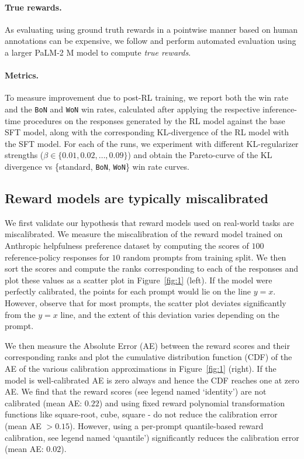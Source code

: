 \documentclass{article}
\newcommand{\theertha}[1]{{\color{red}{theertha: #1}}}
\newcommand{\theertha}[1]{}
\newcommand{\bofn}{\texttt{BoN}\xspace}
\newcommand{\wofn}{\texttt{WoN}\xspace}
\begin{document}
\vspace{-.05in}
\paragraph{True rewards.} As evaluating using ground truth rewards in a pointwise manner based on human annotations can be expensive, we follow \cite{eisenstein2023helping, mudgal2023controlled} and perform automated evaluation using a larger PaLM-2 M model to compute \textit{true rewards}.

\vspace{-.05in}
\paragraph{Metrics.}
To measure improvement due to post-RL training, we report both the win rate and the \bofn and \wofn win rates, calculated after applying the respective inference-time procedures on the responses generated by the RL model against the base SFT model, along with the corresponding KL-divergence of the RL model with the SFT model. For each of the runs, we experiment with different KL-regularizer strengths ($\beta \in \{0.01, 0.02, \ldots , 0.09\}$) and obtain the Pareto-curve of the KL divergence vs \{standard, \bofn, \wofn\} win rate curves. 

%
\subsection{Reward models are typically miscalibrated}
We first validate our hypothesis that reward models used on real-world tasks are miscalibrated. We measure the miscalibration of the reward model trained on Anthropic helpfulness preference dataset by computing the scores of $100$ reference-policy responses for $10$ random prompts from training split. \theertha{ananth: for next iteration, regenerate figure 2 on test split.} We then sort the scores and compute the ranks corresponding to each of the responses and plot these values as a scatter plot in Figure~\ref{fig:1} (left). If the model were perfectly calibrated, the points for each prompt would lie on the line $y=x$. However, observe that for most prompts, the scatter plot deviates significantly from the $y=x$ line, and the extent of this deviation varies depending on the prompt.

We then measure the  Absolute Error (AE) between the reward scores and their corresponding ranks and  plot the cumulative distribution function (CDF) of the AE of the various calibration approximations in Figure~\ref{fig:1} (right). If the model is well-calibrated AE is zero always and hence the CDF reaches one at zero AE. We find that the reward scores (see legend named `identity') are not calibrated (mean AE: $0.22$)
%
and using fixed reward polynomial transformation functions like square-root, cube, square - do not reduce the calibration error (mean AE $> 0.15$). However, using a per-prompt quantile-based reward calibration, see legend named `quantile') significantly reduces the calibration error (mean AE: $0.02$).
\end{document}
